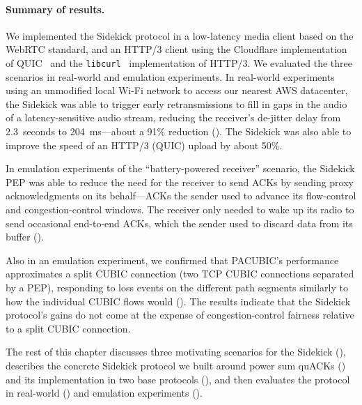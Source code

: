 \paragraph{Summary of results.}

We implemented the Sidekick protocol in a low-latency media client
based on the WebRTC standard, and an HTTP/3 client using the Cloudflare
implementation of QUIC~\cite{quiche} and the \texttt{libcurl}~\cite{libcurl}
implementation of HTTP/3. We evaluated the three scenarios in
real-world and emulation experiments.
In real-world experiments using an unmodified local Wi-Fi network to access our
nearest AWS datacenter, the Sidekick was able to trigger early retransmissions
to fill in gaps in the audio of a latency-sensitive audio stream, reducing the
receiver's de-jitter delay from 2.3~seconds to 204~ms---about a 91\% reduction
(). The Sidekick was also able to improve the
speed of an HTTP/3 (QUIC) upload by about 50\%.

In emulation experiments of the ``battery-powered receiver'' scenario,
the Sidekick PEP was able to reduce the need for the receiver to send ACKs
by sending proxy acknowledgments on its behalf---ACKs the sender used
to advance its flow-control and congestion-control windows. The
receiver only needed to wake up its radio to send occasional
end-to-end ACKs, which the sender used to discard data from its
buffer ().

Also in an emulation experiment, we confirmed that PACUBIC's
performance approximates a split CUBIC connection (two TCP CUBIC
connections separated by a PEP), responding to loss events on the
different path segments similarly to how the individual CUBIC flows would
(). The results indicate that the Sidekick
protocol's gains do not come at the
expense of congestion-control fairness relative to a split CUBIC connection.

\smallskip

The rest of this chapter discusses three motivating scenarios for the Sidekick
(), describes the concrete Sidekick protocol we
built around power sum quACKs () and
its implementation in two base protocols (),
and then evaluates the protocol in real-world ()
and emulation experiments ().

